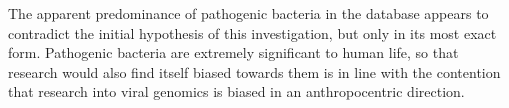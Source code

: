 \documentclass[12pt]{article}
\begin{document}
    The apparent predominance of pathogenic bacteria in the database appears
    to contradict the initial hypothesis of this investigation, but only in its
    most exact form. Pathogenic bacteria are extremely significant to human life,
    so that research would also find itself biased towards them is in line with
    the contention that research into viral genomics is biased in an
    anthropocentric direction.
\end{document}

